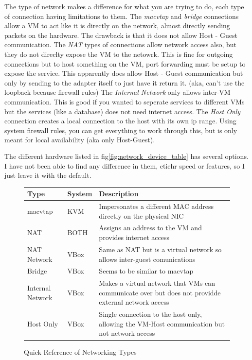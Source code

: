 \documentclass[12pt]{article}
\begin{document}
The type of network makes a difference for what you are trying to do, each type of connection having limitations to them.
The \textit{macvtap} and \textit{bridge} connections allow a VM to act like it is directly on the network, almost directly sending packets on the hardware.
The drawback is that it does not allow Host - Guest communication.
The \textit{NAT} types of connections allow network access also, but they do not direclty expose the VM to the netowrk.
This is fine for outgoing connections but to host something on the VM, port forwarding must be setup to expose the service.
This apparently does allow Host - Guest communication but only by sending to the adapter itself to just have it return it. (aka, can't use the loopback because firewall rules)
The \textit{Internal Network} only allows inter-VM communication.
This is good if you wanted to seperate services to different VMs but the services (like a database) does not need internet access.
The \textit{Host Only} connection creates a local connection to the host with its own ip range.
Using system firewall rules, you can get everything to work through this, but is only meant for local availability (aka only Host-Guest).

The different hardware listed in fig\ref{fig:network_device_table} has several options.
I have not been able to find any difference in them, etiehr speed or features, so I just leave it with the default.

\begin{figure}[ht]
	\centering
	\begin{tabular}{|l|l|p{}|}
	\hline
	Type & System & Description \\ \hline
	macvtap & KVM & Impersonates a different MAC address directly on the physical NIC \\ \hline
	NAT & BOTH & Assigns an address to the VM and provides internet access \\ \hline
	NAT Network & VBox & Same as NAT but is a virtual network so allows inter-guest comunications \\ \hline
	Bridge & VBox & Seems to be similar to macvtap \\ \hline
	Internal Network & VBox & Makes a virtual network that VMs can communicate over but does not providde external network access \\ \hline
	Host Only & VBox & Single connection to the host only, allowing the VM-Host communication but not network access \\ \hline
	\end{tabular}
	\caption{Quick Reference of Networking Types}
	\label{fig:network_type_table}
\end{figure}
\end{document}
